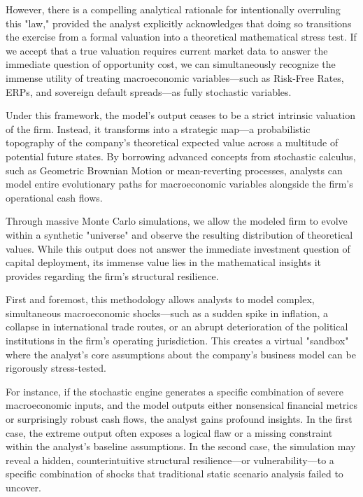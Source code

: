 However, there is a compelling analytical rationale for intentionally overruling this "law," provided the analyst explicitly acknowledges that doing so transitions the exercise from a formal valuation into a theoretical mathematical stress test. If we accept that a true valuation requires current market data to answer the immediate question of opportunity cost, we can simultaneously recognize the immense utility of treating macroeconomic variables—such as Risk-Free Rates, ERPs, and sovereign default spreads—as fully stochastic variables.

Under this framework, the model's output ceases to be a strict intrinsic valuation of the firm. Instead, it transforms into a strategic map—a probabilistic topography of the company's theoretical expected value across a multitude of potential future states. By borrowing advanced concepts from stochastic calculus, such as Geometric Brownian Motion or mean-reverting processes, analysts can model entire evolutionary paths for macroeconomic variables alongside the firm's operational cash flows.

Through massive Monte Carlo simulations, we allow the modeled firm to evolve within a synthetic "universe" and observe the resulting distribution of theoretical values. While this output does not answer the immediate investment question of capital deployment, its immense value lies in the mathematical insights it provides regarding the firm's structural resilience.

First and foremost, this methodology allows analysts to model complex, simultaneous macroeconomic shocks—such as a sudden spike in inflation, a collapse in international trade routes, or an abrupt deterioration of the political institutions in the firm's operating jurisdiction. This creates a virtual "sandbox" where the analyst's core assumptions about the company's business model can be rigorously stress-tested.

For instance, if the stochastic engine generates a specific combination of severe macroeconomic inputs, and the model outputs either nonsensical financial metrics or surprisingly robust cash flows, the analyst gains profound insights. In the first case, the extreme output often exposes a logical flaw or a missing constraint within the analyst's baseline assumptions. In the second case, the simulation may reveal a hidden, counterintuitive structural resilience—or vulnerability—to a specific combination of shocks that traditional static scenario analysis failed to uncover.

